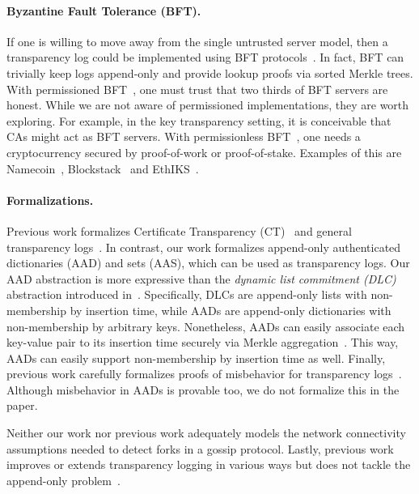 \paragraph{Byzantine Fault Tolerance (BFT).}
If one is willing to move away from the single untrusted server model, then a transparency log could be implemented using BFT protocols~\cite{Lamport1982TheByzantine,pbft,bitcoin}.
In fact, BFT can trivially keep logs append-only and provide lookup proofs via sorted Merkle trees.
With permissioned BFT~\cite{pbft}, one must trust that two thirds of BFT servers are honest.
While we are not aware of permissioned implementations, they are worth exploring.
For example, in the key transparency setting, it is conceivable that CAs might act as BFT servers.
With permissionless BFT~\cite{bitcoin,ethereum}, one needs a cryptocurrency secured by proof-of-work or proof-of-stake.
Examples of this are Namecoin~\cite{namecoin}, Blockstack~\cite{blockstack} and EthIKS~\cite{ethiks}.

\paragraph{Formalizations.}
Previous work formalizes Certificate Transparency (CT)~\cite{transparency-overlays,secure-logging-schemes-and-ct} and general transparency logs~\cite{transparency-overlays}.
In contrast, our work formalizes append-only authenticated dictionaries (AAD) and sets (AAS), which can be used as transparency logs.
Our AAD abstraction is more expressive than the \textit{dynamic list commitment (DLC)} abstraction introduced in~\cite{transparency-overlays}.
Specifically, DLCs are append-only lists with non-membership by insertion time, while AADs are append-only dictionaries with non-membership by arbitrary keys.
Nonetheless, AADs can easily associate each key-value pair to its insertion time securely via Merkle aggregation~\cite{ht}.
This way, AADs can easily support non-membership by insertion time as well.
Finally, previous work carefully formalizes proofs of misbehavior for transparency logs~\cite{transparency-overlays,secure-logging-schemes-and-ct}.
Although misbehavior in AADs is provable too, we do not formalize this in the paper.

Neither our work nor previous work adequately models the network connectivity assumptions needed to detect forks in a gossip protocol.
Lastly, previous work improves or extends transparency logging in various ways but does not tackle the append-only problem~\cite{ct-with-privacy,insynd,lwm}.
